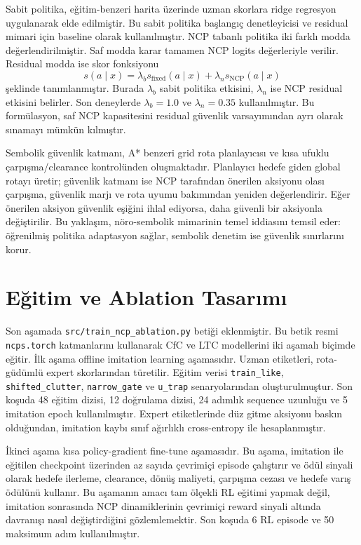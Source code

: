 \documentclass[11pt,a4paper]{article}
\begin{document}
Sabit politika, eğitim-benzeri harita üzerinde uzman skorlara ridge regresyon uygulanarak elde edilmiştir. Bu sabit politika başlangıç denetleyicisi ve residual mimari için baseline olarak kullanılmıştır. NCP tabanlı politika iki farklı modda değerlendirilmiştir. Saf modda karar tamamen NCP logits değerleriyle verilir. Residual modda ise skor fonksiyonu
\[
s(a \mid x) = \lambda_b s_{\mathrm{fixed}}(a \mid x) + \lambda_n s_{\mathrm{NCP}}(a \mid x)
\]
şeklinde tanımlanmıştır. Burada \(\lambda_b\) sabit politika etkisini, \(\lambda_n\) ise NCP residual etkisini belirler. Son deneylerde \(\lambda_b=1.0\) ve \(\lambda_n=0.35\) kullanılmıştır. Bu formülasyon, saf NCP kapasitesini residual güvenlik varsayımından ayrı olarak sınamayı mümkün kılmıştır.

Sembolik güvenlik katmanı, A* benzeri grid rota planlayıcısı ve kısa ufuklu çarpışma/clearance kontrolünden oluşmaktadır. Planlayıcı hedefe giden global rotayı üretir; güvenlik katmanı ise NCP tarafından önerilen aksiyonu olası çarpışma, güvenlik marjı ve rota uyumu bakımından yeniden değerlendirir. Eğer önerilen aksiyon güvenlik eşiğini ihlal ediyorsa, daha güvenli bir aksiyonla değiştirilir. Bu yaklaşım, nöro-sembolik mimarinin temel iddiasını temsil eder: öğrenilmiş politika adaptasyon sağlar, sembolik denetim ise güvenlik sınırlarını korur.

\section{Eğitim ve Ablation Tasarımı}

Son aşamada \texttt{src/train\_ncp\_ablation.py} betiği eklenmiştir. Bu betik resmi \texttt{ncps.torch} katmanlarını kullanarak CfC ve LTC modellerini iki aşamalı biçimde eğitir. İlk aşama offline imitation learning aşamasıdır. Uzman etiketleri, rota-güdümlü expert skorlarından türetilir. Eğitim verisi \texttt{train\_like}, \texttt{shifted\_clutter}, \texttt{narrow\_gate} ve \texttt{u\_trap} senaryolarından oluşturulmuştur. Son koşuda \num{48} eğitim dizisi, \num{12} doğrulama dizisi, \num{24} adımlık sequence uzunluğu ve \num{5} imitation epoch kullanılmıştır. Expert etiketlerinde düz gitme aksiyonu baskın olduğundan, imitation kaybı sınıf ağırlıklı cross-entropy ile hesaplanmıştır.

İkinci aşama kısa policy-gradient fine-tune aşamasıdır. Bu aşama, imitation ile eğitilen checkpoint üzerinden az sayıda çevrimiçi episode çalıştırır ve ödül sinyali olarak hedefe ilerleme, clearance, dönüş maliyeti, çarpışma cezası ve hedefe varış ödülünü kullanır. Bu aşamanın amacı tam ölçekli RL eğitimi yapmak değil, imitation sonrasında NCP dinamiklerinin çevrimiçi reward sinyali altında davranışı nasıl değiştirdiğini gözlemlemektir. Son koşuda \num{6} RL episode ve \num{50} maksimum adım kullanılmıştır.
\end{document}
